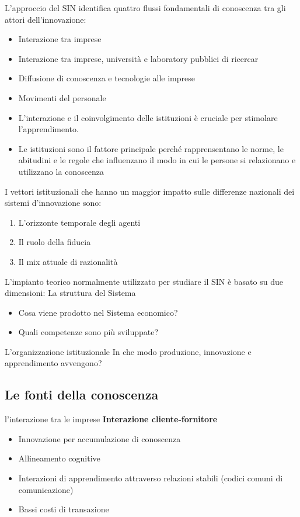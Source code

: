 \documentclass{article}
\begin{document}
L’approccio del SIN identifica quattro flussi fondamentali di conoscenza
tra gli attori dell’innovazione:
\begin{itemize}
	\item Interazione tra imprese
	\item Interazione tra imprese, università e laboratory pubblici di ricercar
	\item Diffusione di conoscenza e tecnologie alle imprese
	\item Movimenti del personale
	\item L’interazione e il coinvolgimento delle istituzioni è cruciale per stimolare
	l’apprendimento.
	\item Le istituzioni sono il fattore principale perché rapprensentano le norme,
	le abitudini e le regole che influenzano il modo in cui le persone si
	relazionano e utilizzano la conoscenza
\end{itemize}

I vettori istituzionali che hanno un maggior impatto sulle differenze
nazionali dei sistemi d’innovazione sono:
\begin{enumerate}
	\item L’orizzonte temporale degli agenti
	\item Il ruolo della fiducia
	\item Il mix attuale di razionalità
\end{enumerate}

L’impianto teorico normalmente utilizzato per studiare il SIN è basato su
due dimensioni:
La struttura del Sistema
\begin{itemize}
	\item Cosa viene prodotto nel Sistema economico?
	\item Quali competenze sono più sviluppate?
\end{itemize}
L’organizzazione istituzionale
In che modo produzione, innovazione e apprendimento avvengono?

\subsection{Le fonti della conoscenza}
l’interazione tra le imprese
\textbf{Interazione cliente-fornitore}
\begin{itemize}
	\item Innovazione per accumulazione di conoscenza
	\item Allineamento cognitive
	\item Interazioni di apprendimento attraverso relazioni stabili
	(codici comuni di comunicazione)
	\item  Bassi costi di transazione
	
\end{itemize}
\end{document}
